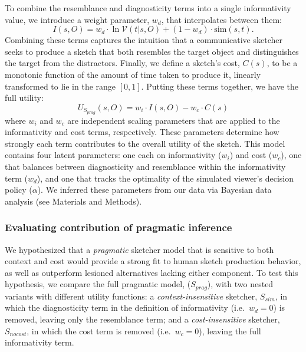 \documentclass[9pt,twocolumn,twoside]{pnas-new}
\begin{document}
To combine the resemblance and diagnosticity terms into a single informativity value, we introduce a weight parameter, $w_{d}$, that interpolates between them:
\begin{equation} \label{prag_interpolation}
I(s,O) = w_{d} \cdot \ln \mathcal{V}(t|s,O) + (1-w_{d}) \cdot \textrm{sim}(s,t). 
\end{equation} 
Combining these terms captures the intuition that a communicative sketcher seeks to produce a sketch that both resembles the target object and distinguishes the target from the distractors.
Finally, we define a sketch's cost, $C(s)$, to be a monotonic function of the amount of time taken to produce it, linearly transformed to lie in the range $[0,1]$. 
Putting these terms together, we have the full utility:
\begin{equation} \label{sketcher_utility}
U_{S_{prag}}(s,O) = w_i \cdot I(s,O) - w_c \cdot  C(s)
\end{equation}
where $w_i$ and $w_c$ are independent scaling parameters that are applied to the informativity and cost terms, respectively.
These parameters determine how strongly each term contributes to the overall utility of the sketch. 
This model contains four latent parameters: one each on informativity ($w_{i}$) and cost ($w_{c}$), one that balances between diagnosticity and resemblance within the informativity term ($w_{d}$), and one that tracks the optimality of the simulated viewer's decision policy ($\alpha$). 
We inferred these parameters from our data via Bayesian data analysis (see Materials and Methods).


\subsubsection*{Evaluating contribution of pragmatic inference}

We hypothesized that a \textit{pragmatic} sketcher model that is sensitive to both context and cost would provide a strong fit to human sketch production behavior, as well as outperform lesioned alternatives lacking either component.
To test this hypothesis, we compare the full pragmatic model, ($S_{prag}$), with two nested variants with different utility functions:
a \textit{context-insensitive} sketcher, $S_{sim}$, in which the diagnosticity term in the definition of informativity (i.e.~$w_{d}{=}0$) is removed, leaving only the resemblance term; and  
a \textit{cost-insensitive} sketcher, $S_{nocost}$, in which the cost term is removed (i.e.~$w_c=0$), leaving the full informativity term. 
\end{document}
